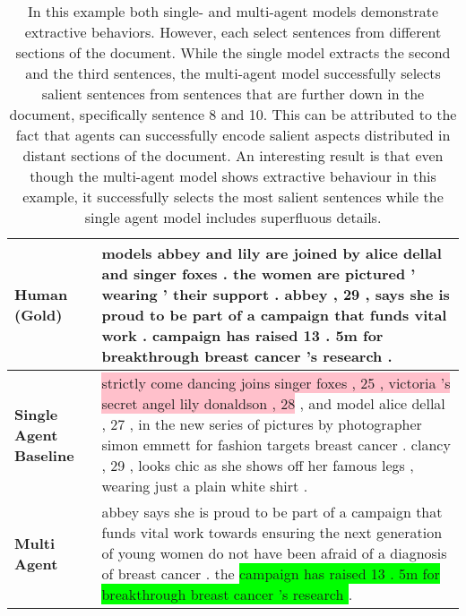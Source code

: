 \documentclass[11pt,a4paper]{article}
\begin{document}
\begin{table*}[t]
\begin{center}
\begin{tabular}{|P{1.5cm}@{}| p{13.8cm}|}
    \\ \hline
    \small  \textbf{Human (Gold)}  & models abbey and lily are joined by alice dellal and singer foxes . the women are pictured ' wearing ' their support . abbey , 29 , says she is proud to be part of a campaign that funds vital work . campaign has raised 13 . 5m for breakthrough breast cancer 's research .
 \\ \hline
\small  \textbf{Single Agent Baseline} &  \colorbox{pink}{strictly come dancing joins singer foxes , 25 , victoria 's secret angel lily donaldson , 28} , and model alice dellal , 27 , in the new series of pictures by photographer simon emmett for fashion targets breast cancer . clancy , 29 , looks chic as she shows off her famous legs , wearing just a plain white shirt .

  \\\hline
\small  \textbf{Multi Agent} &  abbey says she is proud to be part of a campaign that funds vital work towards ensuring the next generation of young women do not have been afraid of a diagnosis of breast cancer . the \colorbox{lime}{campaign has raised 13 . 5m for breakthrough breast cancer 's research }.

 \\ \hline
    \end{tabular}
\end{center}
\vspace{-0.2in}
\caption{In this example both single- and multi-agent models demonstrate extractive behaviors. However, each select sentences from different sections of the document. While the single model extracts the second and the third sentences, the multi-agent model successfully selects salient sentences from sentences that are further down in the document, specifically sentence 8 and 10. This can be attributed to the fact that agents can successfully encode salient aspects distributed in distant sections of the document. An interesting result is that even though the multi-agent model shows extractive behaviour in this example, it successfully selects the most salient sentences while the single agent model includes superfluous details.}
    \label{app:sum1}
\end{table*}
\end{document}
